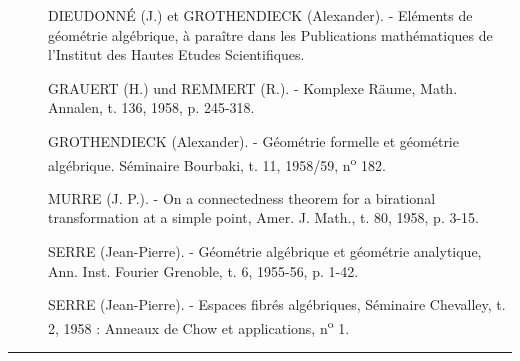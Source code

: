 \begin{description}
  \item[{\normalfont[1]}] DIEUDONNÉ (J.) et GROTHENDIECK (Alexander). - Eléments
    de géométrie algébrique, à paraître dans les Publications mathématiques de
    l'Institut des Hautes Etudes Scientifiques.
  \item[{\normalfont[2]}] GRAUERT (H.) und REMMERT (R.). - Komplexe Räume, Math.
    Annalen, t. 136, 1958, p. 245-318.
  \item[{\normalfont[3]}] GROTHENDIECK (Alexander). - Géométrie formelle et
    géométrie algébrique. Séminaire Bourbaki, t. 11, 1958/59, n\textsuperscript{o} 182.
  \item[{\normalfont[4]}] MURRE (J. P.). - On a connectedness theorem for a
    birational transformation at a simple point, Amer. J. Math., t. 80, 1958,
    p. 3-15.
  \item[{\normalfont[5]}] SERRE (Jean-Pierre). - Géométrie algébrique et géométrie
    analytique, Ann. Inst. Fourier Grenoble, t. 6, 1955-56, p. 1-42.
  \item[{\normalfont[6]}] SERRE (Jean-Pierre). - Espaces fibrés algébriques,
    Séminaire Chevalley, t. 2, 1958 : Anneaux de Chow et applications, n\textsuperscript{o} 1.
\end{description}

\begin{center}
  \rule{.14\linewidth}{.3pt}
\end{center}
